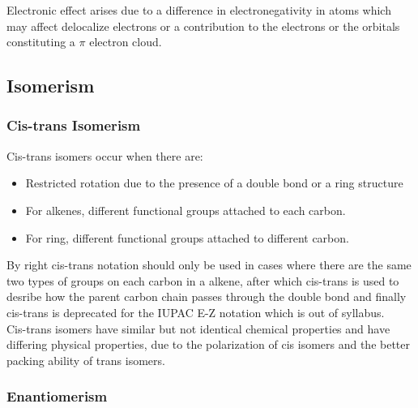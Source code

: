 \documentclass[../main]{subfiles}
\begin{document}
	Electronic effect arises due to a difference in electronegativity in atoms which may affect delocalize electrons or a contribution to the electrons or the orbitals constituting a \(\pi\) electron cloud.


	\subsection{Isomerism}

	\subsubsection{Cis-trans Isomerism}


	Cis-trans isomers occur when there are:

	\begin{itemize}
		\item Restricted rotation due to the presence of a  double bond or a ring structure
		\item For alkenes, different functional groups attached to each carbon.
		\item For ring, different functional groups attached to different carbon.
	\end{itemize}

	By right cis-trans notation should only be used in cases where there are the same two types of groups on each carbon in a alkene, after which cis-trans is used to desribe how the parent carbon chain passes through the double bond and finally cis-trans is deprecated for the IUPAC E-Z notation which is out of syllabus. \\

	Cis-trans isomers have similar but not identical chemical properties and have differing physical properties, due to the polarization of cis isomers and the better packing ability of trans isomers.

	\subsubsection{Enantiomerism}
\end{document}
